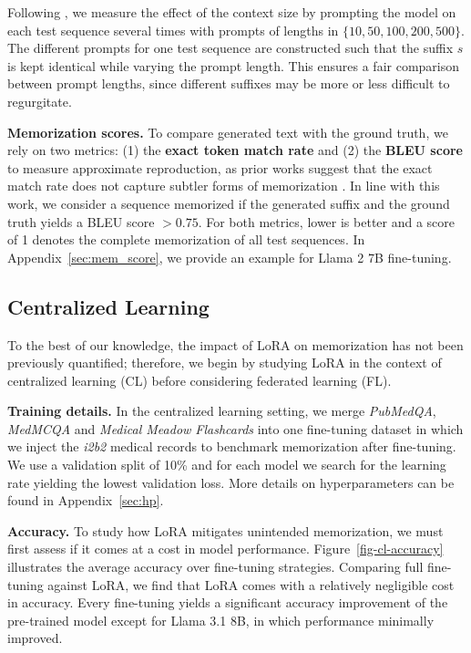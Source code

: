 Following \citet{memo}, we measure the effect of the context size by prompting the model on each test sequence several times with prompts of lengths in $\{10, 50, 100, 200, 500\}$.
The different prompts for one test sequence are constructed such that the suffix $s$ is kept identical while varying the prompt length. This ensures a fair comparison between prompt lengths, since different suffixes may be more or less difficult to regurgitate.

\textbf{Memorization scores.} To compare generated text with the ground truth, we rely on two metrics: (1) the \textbf{exact token match rate} and (2) the \textbf{BLEU score} to measure approximate reproduction, as prior works suggest that the exact match rate does not capture subtler forms of memorization \citep{ippolito2023verbatim}. In line with this work, we consider a sequence memorized if the generated suffix and the ground truth yields a BLEU score $> 0.75$. For both metrics, lower is better and a score of 1 denotes the complete memorization of all test sequences. In Appendix~\ref{sec:mem_score}, we provide an example for Llama 2 7B fine-tuning.

\subsection{Centralized Learning}
\label{cl}

To the best of our knowledge, the impact of LoRA on memorization has not been previously quantified; therefore, we begin by studying LoRA in the context of centralized learning (CL) before considering federated learning (FL).

\textbf{Training details.} In the centralized learning setting, we merge \textit{PubMedQA}, \textit{MedMCQA}  and \textit{Medical Meadow Flashcards} into one fine-tuning dataset in which we inject the \textit{i2b2} medical records to benchmark memorization after fine-tuning. We use a validation split of 10\% and for each model we search for the learning rate yielding the lowest validation loss. More details on hyperparameters can be found in Appendix~\ref{sec:hp}.

\textbf{Accuracy.} To study how LoRA mitigates unintended memorization, we must first assess if it comes at a cost in model performance. Figure~\ref{fig-cl-accuracy} illustrates the average accuracy over fine-tuning strategies. Comparing full fine-tuning against LoRA, we find that LoRA comes with a relatively negligible cost in accuracy. Every fine-tuning yields a significant accuracy improvement of the pre-trained model except for Llama 3.1 8B, in which performance minimally improved.

